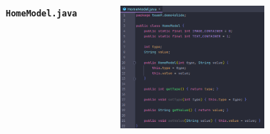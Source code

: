 \documentclass{beamer}
\begin{document}
\begin{frame}
\begin{columns}
\begin{figure}
        \end{figure}
        \indent \textbf{\texttt{HomeModel.java}}
        \begin{figure}
            \centering
            \includegraphics[width=\textwidth]{images/17.png}
        \end{figure}
    \end{columns}
\end{frame}
\end{document}
